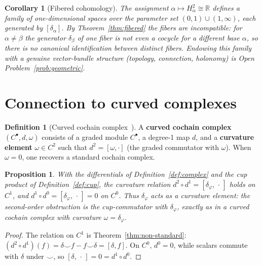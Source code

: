 \documentclass[11pt,a4paper]{article}
\theoremstyle{plain}
\newtheorem{proposition}[theorem]{Proposition}
\newtheorem{corollary}[theorem]{Corollary}
\theoremstyle{definition}
\newtheorem{definition}[theorem]{Definition}
\theoremstyle{remark}
\newcommand{\RR}{\mathbb{R}}
\begin{document}
\begin{corollary}[Fibered cohomology]
\label{cor:fibered}
The assignment $\alpha \mapsto H^2_\alpha \cong \RR$ defines a family
of one-dimensional spaces over the parameter set $(0,1) \cup
(1,\infty)$, each generated by $[\delta_\alpha]$. By
Theorem~\ref{thm:fibered} the fibers are \emph{incompatible}: for
$\alpha \neq \beta$ the generator $\delta_\beta$ of one fiber is not
even a cocycle for a different base $\alpha$, so there is no canonical
identification between distinct fibers. Endowing this family with a
genuine vector-bundle structure (topology, connection, holonomy) is
Open Problem~\ref{prob:geometric}.
\end{corollary}

\section{Connection to curved complexes}
\label{sec:curved}

\begin{definition}[{Curved cochain complex~\cite{Positselski2011}}]
\label{def:curved}
A \textbf{curved cochain complex} $(C^\bullet, d, \omega)$ consists of 
a graded module $C^\bullet$, a degree-1 map $d$, and a 
\textbf{curvature element} $\omega \in C^2$ such that $d^2 = 
[\omega, \cdot]$ (the graded commutator with $\omega$). When 
$\omega = 0$, one recovers a standard cochain complex.
\end{definition}

\begin{proposition}
\label{thm:curved}
With the differentials of Definition~\ref{def:complex} and the cup
product of Definition~\ref{def:cup}, the curvature relation
$d^2 \circ d^1 = [\delta_\varphi, \,\cdot\,]$ holds on $C^1$, and
$d^1 \circ d^0 = [\delta_\varphi, \,\cdot\,] = 0$ on $C^0$. Thus
$\delta_\varphi$ acts as a curvature element: the second-order
obstruction is the cup-commutator with $\delta_\varphi$, exactly as in
a curved cochain complex with curvature $\omega = \delta_\varphi$.
\end{proposition}

\begin{proof}
The relation on $C^1$ is Theorem~\ref{thm:non-standard}: $(d^2 \circ
d^1)(f) = \delta \smile f - f \smile \delta = [\delta, f]$. On $C^0$,
$d^0 = 0$, while scalars commute with $\delta$ under $\smile$, so
$[\delta, \,\cdot\,] = 0 = d^1 \circ d^0$.
\end{proof}
\end{document}

